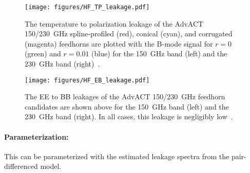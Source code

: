 \begin{figure}[h!]
\centering
\texttt{[image: figures/HF\_TP\_leakage.pdf]}
\caption{The temperature to polarization leakage of the AdvACT 150/230~GHz spline-profiled (red), conical (cyan), and corrugated (magenta) feedhorns are plotted with the B-mode signal for $r=0$ (green) and $r=0.01$ (blue) for the 150~GHz band (left) and the 230~GHz band (right)~\cite{Simon_Thesis_2016}.}
\label{fig:HF_TP_leakage}
\end{figure}

\begin{figure}[h!]
\centering
\texttt{[image: figures/HF\_EB\_leakage.pdf]}
\caption{The EE to BB leakages of the AdvACT 150/230~GHz feedhorn candidates are shown above for the 150~GHz band (left) and the 230~GHz band (right). In all cases, this leakage is negligibly low~\cite{Simon_Thesis_2016}.}
\label{fig:HF_EB_leakage}
\end{figure}


\paragraph{Parameterization:}
This can be parameterized with the estimated leakage spectra from the pair-differenced model.

